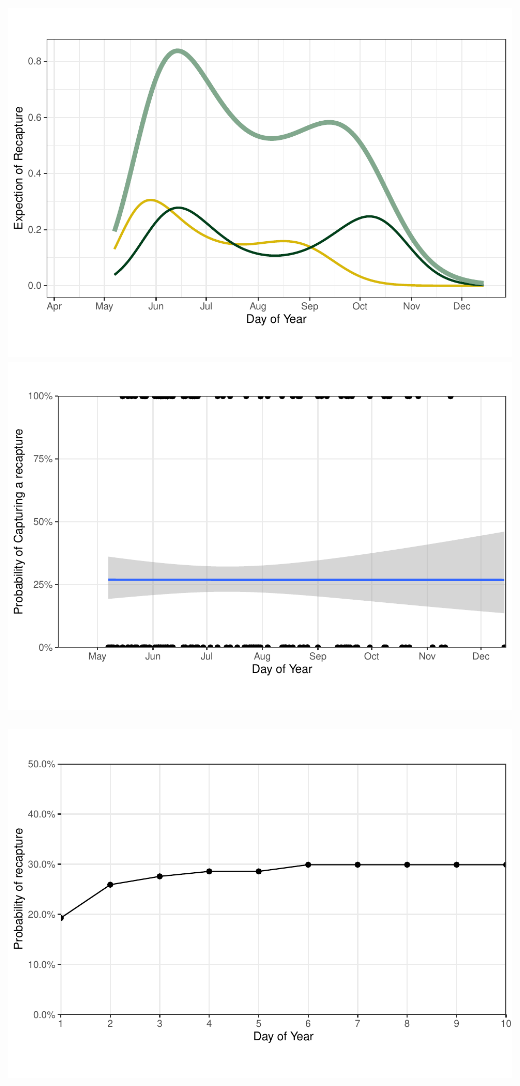 \documentclass[]{interact}
\theoremstyle{plain}%
\theoremstyle{definition}
\theoremstyle{remark}
\begin{document}
\includegraphics{manuscript_files/figure-latex/expection-1.pdf}
\includegraphics{manuscript_files/figure-latex/capture vs recapture-1.pdf}

\includegraphics{manuscript_files/figure-latex/unnamed-chunk-14-1.pdf}
\end{document}
